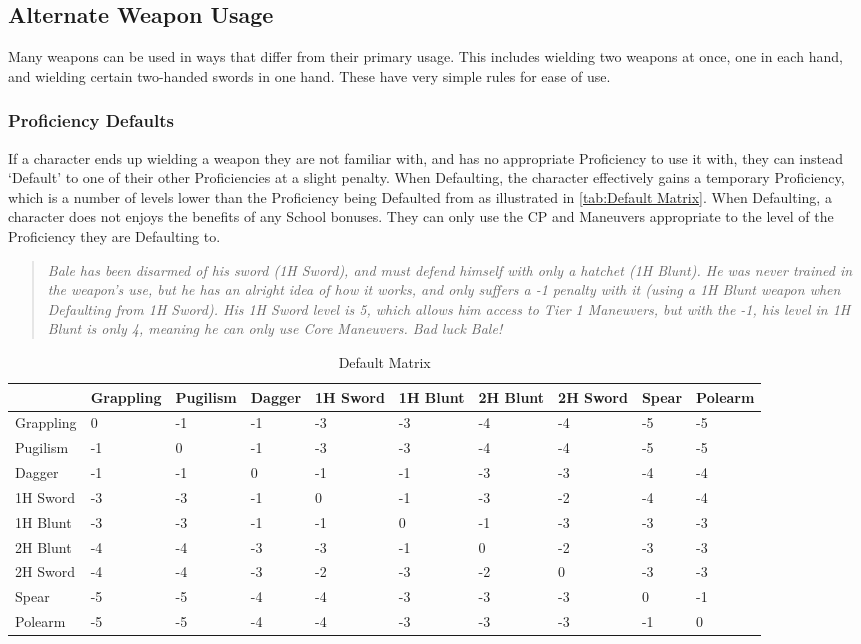 \documentclass[oneside,11pt,english]{book}
\begin{document}
\subsection{Alternate Weapon Usage}
Many weapons can be used in ways that differ from their primary usage. This includes wielding two 
weapons at once, one in each hand, and wielding certain two-handed swords in one hand. These have very 
simple rules for ease of use. 

\subsubsection{Proficiency Defaults}
If a character ends up wielding a weapon they are not familiar with, and has no
appropriate Proficiency to use it with, they can instead ‘Default’ to one of
their other Proficiencies at a slight penalty. When Defaulting, the character
effectively gains a temporary Proficiency, which is a number of levels lower
than the Proficiency being Defaulted from as illustrated in \autoref{tab:Default
  Matrix}. When Defaulting, a character does not enjoys the benefits of any
School bonuses. They can only use the CP and Maneuvers appropriate to the level
of the Proficiency they are Defaulting to.  

\begin{quote}
  \emph{Bale has been disarmed of his sword (1H Sword), and must defend himself
    with only a hatchet (1H Blunt). He was never trained in the weapon’s use,
    but he has an alright idea of how it works, and only suffers a -1 penalty
    with it (using a 1H Blunt weapon when Defaulting from 1H Sword). His 1H
    Sword level is 5, which allows him access to Tier 1 Maneuvers, but with the
    -1, his level in 1H Blunt is only 4, meaning he can only use Core Maneuvers.
    Bad luck Bale! } 
\end{quote}

\begin{table}
  \centering
  \caption{Default Matrix}
  \label{tab:Default Matrix}
  \begin{tabu} spread 0pt {*{10}{X[-1,c]}}
    &Grappling &Pugilism &Dagger &1H Sword &1H Blunt &2H Blunt &2H Sword &Spear &Polearm\\\toprule
    Grappling &0 &-1 &-1 &-3 &-3 &-4 &-4 &-5 &-5\\
    Pugilism &-1 &0 &-1 &-3 &-3 &-4 &-4 &-5 &-5\\
    Dagger &-1 &-1 &0 &-1 &-1 &-3 &-3 &-4 &-4\\
    1H Sword &-3 &-3 &-1 &0 &-1 &-3 &-2 &-4 &-4\\
    1H Blunt &-3 &-3 &-1 &-1 &0 &-1 &-3 &-3 &-3\\
    2H Blunt &-4 &-4 &-3 &-3 &-1 &0 &-2 &-3 &-3\\
    2H Sword &-4 &-4 &-3 &-2 &-3 &-2 &0 &-3 &-3\\
    Spear &-5 &-5 &-4 &-4 &-3 &-3 &-3 &0 &-1\\
    Polearm &-5 &-5 &-4 &-4 &-3 &-3 &-3 &-1 &0\\
  \end{tabu}
\end{table}
\end{document}
